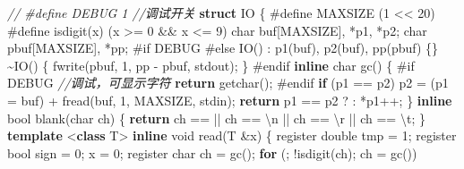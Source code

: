 \documentclass[
]{article}
\newenvironment{Shaded}{}{}
\newcommand{\AttributeTok}[1]{\textcolor[rgb]{0.49,0.56,0.16}{#1}}
\newcommand{\CharTok}[1]{\textcolor[rgb]{0.25,0.44,0.63}{#1}}
\newcommand{\CommentTok}[1]{\textcolor[rgb]{0.38,0.63,0.69}{\textit{#1}}}
\newcommand{\ControlFlowTok}[1]{\textcolor[rgb]{0.00,0.44,0.13}{\textbf{#1}}}
\newcommand{\DataTypeTok}[1]{\textcolor[rgb]{0.56,0.13,0.00}{#1}}
\newcommand{\DecValTok}[1]{\textcolor[rgb]{0.25,0.63,0.44}{#1}}
\newcommand{\KeywordTok}[1]{\textcolor[rgb]{0.00,0.44,0.13}{\textbf{#1}}}
\newcommand{\NormalTok}[1]{#1}
\newcommand{\PreprocessorTok}[1]{\textcolor[rgb]{0.74,0.48,0.00}{#1}}
\newcommand{\SpecialCharTok}[1]{\textcolor[rgb]{0.25,0.44,0.63}{#1}}
\begin{document}
\begin{Shaded}
\begin{Highlighting}[]
\CommentTok{// \#define DEBUG 1  //调试开关}
\KeywordTok{struct}\NormalTok{ IO \{}
\PreprocessorTok{\#define MAXSIZE }\NormalTok{(}\DecValTok{1}\PreprocessorTok{ }\NormalTok{\textless{}\textless{}}\PreprocessorTok{ }\DecValTok{20}\NormalTok{)}
\PreprocessorTok{\#define isdigit}\NormalTok{(x)}\PreprocessorTok{ }\NormalTok{(x}\PreprocessorTok{ }\NormalTok{\textgreater{}=}\PreprocessorTok{ }\CharTok{\textquotesingle{}0\textquotesingle{}}\PreprocessorTok{ }\NormalTok{\&\&}\PreprocessorTok{ }\NormalTok{x}\PreprocessorTok{ }\NormalTok{\textless{}=}\PreprocessorTok{ }\CharTok{\textquotesingle{}9\textquotesingle{}}\NormalTok{)}
  \DataTypeTok{char}\NormalTok{ buf[MAXSIZE], *p1, *p2;}
  \DataTypeTok{char}\NormalTok{ pbuf[MAXSIZE], *pp;}
\PreprocessorTok{\#if DEBUG}
\PreprocessorTok{\#else}
\NormalTok{  IO() : p1(buf), p2(buf), pp(pbuf) \{\}}
\NormalTok{  \textasciitilde{}IO() \{ fwrite(pbuf, }\DecValTok{1}\NormalTok{, pp {-} pbuf, stdout); \}}
\PreprocessorTok{\#endif}
  \KeywordTok{inline} \DataTypeTok{char}\NormalTok{ gc() \{}
\PreprocessorTok{\#if DEBUG  }\CommentTok{//调试，可显示字符}
    \ControlFlowTok{return}\NormalTok{ getchar();}
\PreprocessorTok{\#endif}
    \ControlFlowTok{if}\NormalTok{ (p1 == p2) p2 = (p1 = buf) + fread(buf, }\DecValTok{1}\NormalTok{, MAXSIZE, stdin);}
    \ControlFlowTok{return}\NormalTok{ p1 == p2 ? }\CharTok{\textquotesingle{} \textquotesingle{}}\NormalTok{ : *p1++;}
\NormalTok{  \}}
  \KeywordTok{inline} \DataTypeTok{bool}\NormalTok{ blank(}\DataTypeTok{char}\NormalTok{ ch) \{}
    \ControlFlowTok{return}\NormalTok{ ch == }\CharTok{\textquotesingle{} \textquotesingle{}}\NormalTok{ || ch == }\CharTok{\textquotesingle{}}\SpecialCharTok{\textbackslash{}n}\CharTok{\textquotesingle{}}\NormalTok{ || ch == }\CharTok{\textquotesingle{}}\SpecialCharTok{\textbackslash{}r}\CharTok{\textquotesingle{}}\NormalTok{ || ch == }\CharTok{\textquotesingle{}}\SpecialCharTok{\textbackslash{}t}\CharTok{\textquotesingle{}}\NormalTok{;}
\NormalTok{  \}}
  \KeywordTok{template}\NormalTok{ \textless{}}\KeywordTok{class}\NormalTok{ T\textgreater{}}
  \KeywordTok{inline} \DataTypeTok{void}\NormalTok{ read(T \&x) \{}
    \AttributeTok{register} \DataTypeTok{double}\NormalTok{ tmp = }\DecValTok{1}\NormalTok{;}
    \AttributeTok{register} \DataTypeTok{bool}\NormalTok{ sign = }\DecValTok{0}\NormalTok{;}
\NormalTok{    x = }\DecValTok{0}\NormalTok{;}
    \AttributeTok{register} \DataTypeTok{char}\NormalTok{ ch = gc();}
    \ControlFlowTok{for}\NormalTok{ (; !isdigit(ch); ch = gc())}

\end{Highlighting}
\end{Shaded}
\end{document}
